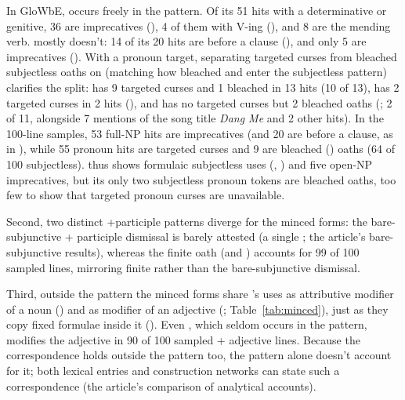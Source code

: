 \documentclass[12pt]{article}
\begin{document}
In GloWbE,  occurs freely in the pattern. Of its 51 hits with a determinative or genitive, 36 are imprecatives (), 4 of them with  V-ing (), and 8 are the mending verb.  mostly doesn't: 14 of its 20 hits are  before a clause (), and only 5 are imprecatives (). With a pronoun target, separating targeted curses from bleached subjectless oaths on  (matching how bleached  and  enter the subjectless pattern) clarifies the split:  has 9 targeted curses and 1 bleached  in 13 hits (10 of 13),  has 2 targeted curses in 2 hits (), and  has no targeted curses but 2 bleached oaths (; 2 of 11, alongside 7 mentions of the song title \emph{Dang Me} and 2 other hits). In the 100-line  samples, 53 full-NP hits are imprecatives (and 20 are  before a clause, as in ), while 55 pronoun hits are targeted curses and 9 are bleached  () oaths (64 of 100 subjectless).  thus shows formulaic subjectless uses (, ) and five open-NP imprecatives, but its only two subjectless pronoun tokens are bleached oaths, too few to show that targeted pronoun curses are unavailable.

Second, two distinct +participle patterns diverge for the minced forms: the bare-subjunctive  + participle dismissal is barely attested (a single ; the article's bare-subjunctive results), whereas the finite oath  (and ) accounts for 99 of 100 sampled  lines, mirroring finite  rather than the bare-subjunctive dismissal.

Third, outside the pattern the minced forms share 's uses as attributive modifier of a noun () and as modifier of an adjective (; Table~\ref{tab:minced}), just as they copy fixed formulae inside it (). Even , which seldom occurs in the pattern, modifies the adjective in 90 of 100 sampled  + adjective lines. Because the correspondence holds outside the pattern too, the pattern alone doesn't account for it; both lexical entries and construction networks can state such a correspondence (the article's comparison of analytical accounts).
\end{document}
